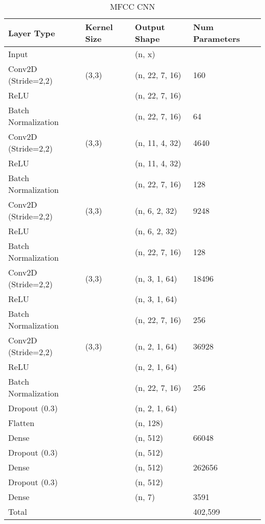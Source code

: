 \begin{table}[h]
\caption{MFCC CNN}
\centering
\begin{tabular}{l|l|l|l}
Layer Type & Kernel Size & Output Shape & Num Parameters \\ \hline
Input & \ & (n, x) & \\
Conv2D (Stride=2,2) & (3,3) & (n, 22, 7, 16) & 160\\
ReLU                &       & (n, 22, 7, 16) & \\
Batch Normalization &       & (n, 22, 7, 16) & 64 \\
Conv2D (Stride=2,2) & (3,3) & (n, 11, 4, 32) & 4640\\
ReLU                &       & (n, 11, 4, 32) & \\
Batch Normalization &       & (n, 22, 7, 16) & 128 \\
Conv2D (Stride=2,2) & (3,3) & (n, 6, 2, 32) & 9248\\
ReLU                &       & (n, 6, 2, 32) & \\
Batch Normalization &       & (n, 22, 7, 16) & 128 \\
Conv2D (Stride=2,2) & (3,3) & (n, 3, 1, 64) & 18496\\
ReLU                &       & (n, 3, 1, 64) & \\
Batch Normalization &       & (n, 22, 7, 16) & 256 \\
Conv2D (Stride=2,2) & (3,3) & (n, 2, 1, 64) & 36928\\
ReLU                &       & (n, 2, 1, 64) & \\
Batch Normalization &       & (n, 22, 7, 16) & 256 \\
Dropout (0.3)       &       & (n, 2, 1, 64) & \\
Flatten             &       & (n, 128) & \\
Dense 				& 		& (n, 512) & 66048\\
Dropout (0.3) 		& 		& (n, 512)  & \\
Dense 				& 		& (n, 512) & 262656\\
Dropout (0.3) 		& 		& (n, 512)  & \\
Dense               &       & (n, 7) & 3591\\
\hline
\hline
Total               &       &        & 402,599\\
\end{tabular}
\end{table}

